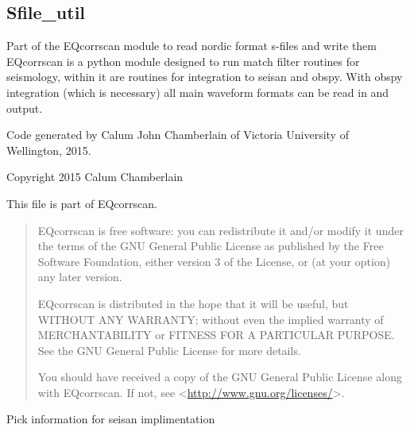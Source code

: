 \documentclass[a4paper,10pt,english]{sphinxmanual}
\begin{document}
\subsection{Sfile\_util}
\label{utils:module-Sfile_util}\label{utils:sfile-util}
Part of the EQcorrscan module to read nordic format s-files and write them
EQcorrscan is a python module designed to run match filter routines for
seismology, within it are routines for integration to seisan and obspy.
With obspy integration (which is necessary) all main waveform formats can be
read in and output.

Code generated by Calum John Chamberlain of Victoria University of Wellington,
2015.

Copyright 2015 Calum Chamberlain

This file is part of EQcorrscan.
\begin{quote}

EQcorrscan is free software: you can redistribute it and/or modify
it under the terms of the GNU General Public License as published by
the Free Software Foundation, either version 3 of the License, or
(at your option) any later version.

EQcorrscan is distributed in the hope that it will be useful,
but WITHOUT ANY WARRANTY; without even the implied warranty of
MERCHANTABILITY or FITNESS FOR A PARTICULAR PURPOSE.  See the
GNU General Public License for more details.

You should have received a copy of the GNU General Public License
along with EQcorrscan.  If not, see \textless{}\href{http://www.gnu.org/licenses/}{http://www.gnu.org/licenses/}\textgreater{}.
\end{quote}

\begin{fulllineitems}
\label{utils:Sfile_util.PICK}
Pick information for seisan implimentation

\end{fulllineitems}

\end{document}
